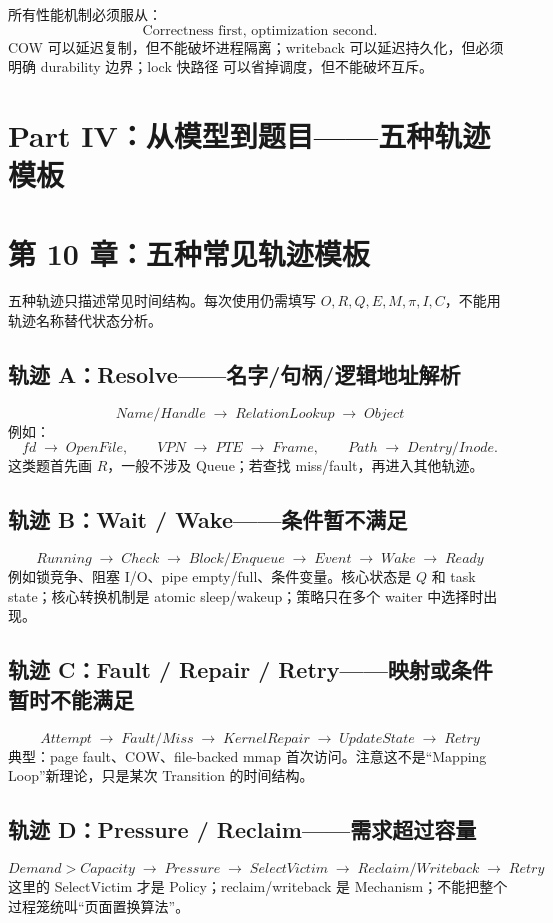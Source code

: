 \documentclass[11pt,a4paper]{ctexart}
\newcommand{\arr}{\;\longrightarrow\;}
\begin{document}
\begin{warn}[优化不能破坏不变量]
所有性能机制必须服从：
\[
\boxed{\text{Correctness first, optimization second}.}
\]
COW 可以延迟复制，但不能破坏进程隔离；writeback 可以延迟持久化，但必须明确 durability 边界；lock 快路径 可以省掉调度，但不能破坏互斥。
\end{warn}

\newpage
\section{Part IV：从模型到题目——五种轨迹模板}

\section{第 10 章：五种常见轨迹模板}

\begin{corebox}[使用方法]
五种轨迹只描述常见时间结构。每次使用仍需填写 $O,R,Q,E,M,\pi,I,C$，不能用轨迹名称替代状态分析。
\end{corebox}

\subsection{轨迹 A：Resolve——名字/句柄/逻辑地址解析}
\[
\boxed{Name/Handle\arr RelationLookup\arr Object}
\]
例如：
\[
fd\arr OpenFile,
\qquad
VPN\arr PTE\arr Frame,
\qquad
Path\arr Dentry/Inode.
\]
这类题首先画 $R$，一般不涉及 Queue；若查找 miss/fault，再进入其他轨迹。

\subsection{轨迹 B：Wait / Wake——条件暂不满足}
\[
\boxed{Running\arr Check\arr Block/Enqueue\arr Event\arr Wake\arr Ready}
\]
例如锁竞争、阻塞 I/O、pipe empty/full、条件变量。核心状态是 $Q$ 和 task state；核心转换机制是 atomic sleep/wakeup；策略只在多个 waiter 中选择时出现。

\subsection{轨迹 C：Fault / Repair / Retry——映射或条件暂时不能满足}
\[
\boxed{Attempt\arr Fault/Miss\arr KernelRepair\arr UpdateState\arr Retry}
\]
典型：page fault、COW、file-backed mmap 首次访问。注意这不是“Mapping Loop”新理论，只是某次 Transition 的时间结构。

\subsection{轨迹 D：Pressure / Reclaim——需求超过容量}
\[
\boxed{Demand>Capacity\arr Pressure\arr SelectVictim\arr Reclaim/Writeback\arr Retry}
\]
这里的 SelectVictim 才是 Policy；reclaim/writeback 是 Mechanism；不能把整个过程笼统叫“页面置换算法”。
\end{document}
